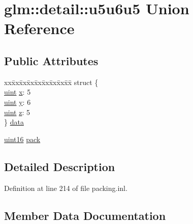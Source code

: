 \hypertarget{unionglm_1_1detail_1_1u5u6u5}{}\section{glm\+::detail\+::u5u6u5 Union Reference}
\label{unionglm_1_1detail_1_1u5u6u5}
\subsection*{Public Attributes}
\begin{DoxyCompactItemize}
\item 
\begin{tabbing}
xx\=xx\=xx\=xx\=xx\=xx\=xx\=xx\=xx\=\kill
struct \{\\
\>\mbox{\hyperlink{group__core__precision_ga4fd29415871152bfb5abd588334147c8}{uint}} \mbox{\hyperlink{unionglm_1_1detail_1_1u5u6u5_ae265d637dd0e4430f3e96a509e19fb06}{x}}: 5\\
\>\mbox{\hyperlink{group__core__precision_ga4fd29415871152bfb5abd588334147c8}{uint}} \mbox{\hyperlink{unionglm_1_1detail_1_1u5u6u5_ab60581ca18c5faa107d8cbd5cfa946c9}{y}}: 6\\
\>\mbox{\hyperlink{group__core__precision_ga4fd29415871152bfb5abd588334147c8}{uint}} \mbox{\hyperlink{unionglm_1_1detail_1_1u5u6u5_ae0c24b8bea4457e78fe32f6e0cee6369}{z}}: 5\\
\} \mbox{\hyperlink{unionglm_1_1detail_1_1u5u6u5_a957492a30539dd0a076ea36d63cd10f9}{data}}\\

\end{tabbing}\item 
\mbox{\hyperlink{namespaceglm_1_1detail_a47b2a7d006d187338e8031a352d1ce56}{uint16}} \mbox{\hyperlink{unionglm_1_1detail_1_1u5u6u5_a5ea89c1a491b7e1442cad93d92628b2e}{pack}}
\end{DoxyCompactItemize}


\subsection{Detailed Description}


Definition at line 214 of file packing.\+inl.



\subsection{Member Data Documentation}
\mbox{\label{unionglm_1_1detail_1_1u5u6u5_a957492a30539dd0a076ea36d63cd10f9}} 
